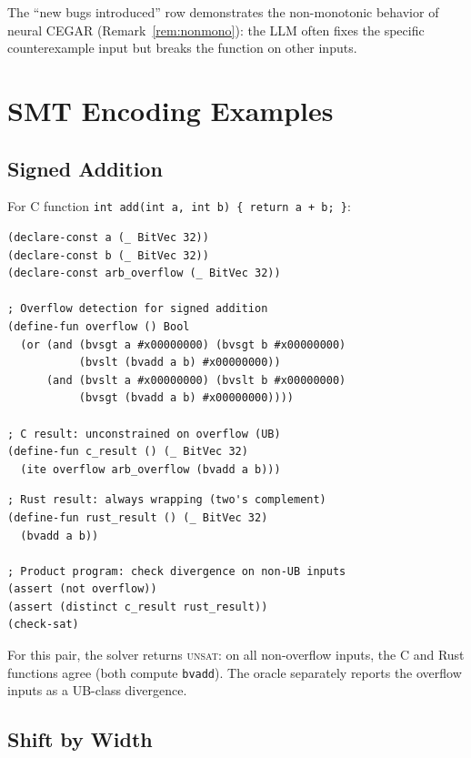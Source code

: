 \documentclass[11pt]{article}
\newcommand{\UNSAT}{\textsc{unsat}}
\begin{document}
The ``new bugs introduced'' row demonstrates the non-monotonic behavior
of neural CEGAR (Remark~\ref{rem:nonmono}): the LLM often fixes the
specific counterexample input but breaks the function on other inputs.

\section{SMT Encoding Examples}\label{app:smt}

\subsection{Signed Addition}

For C function \texttt{int add(int a, int b) \{ return a + b; \}}:

\begin{lstlisting}[language={},caption={SMT-LIB encoding for C signed addition.},
  label={lst:smt-c-add}]
(declare-const a (_ BitVec 32))
(declare-const b (_ BitVec 32))
(declare-const arb_overflow (_ BitVec 32))

; Overflow detection for signed addition
(define-fun overflow () Bool
  (or (and (bvsgt a #x00000000) (bvsgt b #x00000000)
           (bvslt (bvadd a b) #x00000000))
      (and (bvslt a #x00000000) (bvslt b #x00000000)
           (bvsgt (bvadd a b) #x00000000))))

; C result: unconstrained on overflow (UB)
(define-fun c_result () (_ BitVec 32)
  (ite overflow arb_overflow (bvadd a b)))
\end{lstlisting}

\begin{lstlisting}[language={},caption={SMT-LIB encoding for Rust wrapping addition.},
  label={lst:smt-rust-add}]
; Rust result: always wrapping (two's complement)
(define-fun rust_result () (_ BitVec 32)
  (bvadd a b))

; Product program: check divergence on non-UB inputs
(assert (not overflow))
(assert (distinct c_result rust_result))
(check-sat)
\end{lstlisting}

For this pair, the solver returns \UNSAT{}: on all non-overflow inputs,
the C and Rust functions agree (both compute \texttt{bvadd}).  The oracle
separately reports the overflow inputs as a UB-class divergence.

\subsection{Shift by Width}
\end{document}
